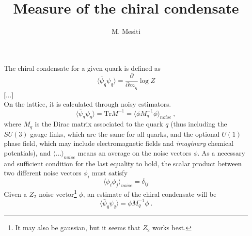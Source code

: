 \documentclass[a4paper,10pt]{article}
\title{Measure of the chiral condensate}
\author{M. Mesiti}
\date{}
\begin{document}
\maketitle

The chiral condensate for a given quark is defined as 
\begin{equation}
 \langle \bar{\psi}_q \psi_q \rangle = \frac{\partial}{\partial m_q} \log Z
\end{equation}
[...]\\
On the lattice, it is calculated through noisy estimators. 
\begin{equation}
 \langle \bar{\psi}_q \psi_q \rangle  = \textrm{Tr} M^{-1} = \langle \phi 
M_q^{-1} \phi \rangle_{noise} \ , 
\end{equation}
where $M_q$ is the Dirac matrix associated to the 
quark $q$ (thus including the $SU(3)$ gauge links, which are the same for all 
quarks, and the optional $U(1)$ phase field, which may include electromagnetic 
fields and \emph{imaginary} chemical potentials), and $\langle \ldots 
\rangle_{noise}$ means an average on the noise vectors $\phi$. As a necessary 
and sufficient condition for the last equality to hold, the scalar product 
between two different noise vectors $\phi_i$ must satisfy
\begin{equation}
 \langle \phi_i \phi_j \rangle_{noise} = \delta_{ij}
\end{equation}
Given a $Z_2$ noise vector\footnote{It may also be 
gaussian, but it 
seems that $Z_2$ works best.} $\phi$, an estimate of the chiral condensate will 
be
\begin{equation}
 \langle \bar{\psi}_q \psi_q \rangle  = \phi M_q^{-1} \phi \ .
\end{equation}
\end{document}
